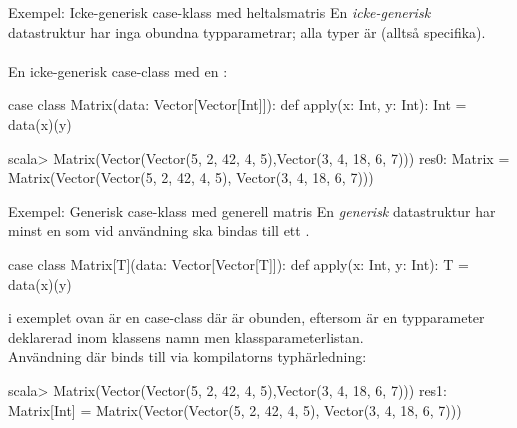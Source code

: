 



\begin{Slide}{Exempel: Icke-generisk case-klass med heltalsmatris}
  En \emph{icke-generisk} datastruktur har inga obundna typparametrar; alla typer är  (alltså specifika). \\~\\ En icke-generisk case-class med en :
  \begin{Code}
  case class Matrix(data: Vector[Vector[Int]]):
    def apply(x: Int, y: Int): Int = data(x)(y)
  \end{Code}

  \begin{REPL}
  scala> Matrix(Vector(Vector(5, 2, 42, 4, 5),Vector(3, 4, 18, 6, 7)))
  res0: Matrix =
    Matrix(Vector(Vector(5, 2, 42, 4, 5), Vector(3, 4, 18, 6, 7)))
  \end{REPL}

\end{Slide}





\begin{Slide}{Exempel: Generisk case-klass med generell matris}
  En \emph{generisk} datastruktur har minst en   som vid användning ska bindas till ett  .
  
  \begin{Code}
  case class Matrix[T](data: Vector[Vector[T]]):
    def apply(x: Int, y: Int): T = data(x)(y)
  \end{Code}
   i exemplet ovan är en  case-class där  är obunden, eftersom  är en typparameter deklarerad inom \code{[]}  klassens namn men  klassparameterlistan. \\

  \vspace{0.5em} Användning där  binds till  via kompilatorns typhärledning:
  \begin{REPL}
  scala> Matrix(Vector(Vector(5, 2, 42, 4, 5),Vector(3, 4, 18, 6, 7)))
  res1: Matrix[Int] =
    Matrix(Vector(Vector(5, 2, 42, 4, 5), Vector(3, 4, 18, 6, 7)))
  \end{REPL}

\end{Slide}




